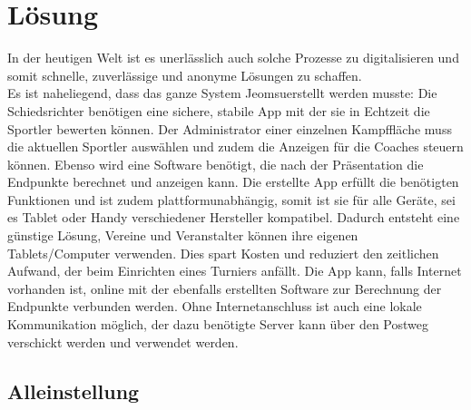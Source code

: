 \section{Lösung}

In der heutigen Welt ist es unerlässlich auch solche Prozesse zu digitalisieren und somit schnelle,
    zuverlässige und anonyme Lösungen zu schaffen.
\\
Es ist naheliegend, dass das ganze System \grqq Jeomsu\grqq erstellt werden musste:
Die Schiedsrichter benötigen eine sichere, stabile App mit der sie in Echtzeit die Sportler bewerten können.
Der Administrator einer einzelnen Kampffläche muss die aktuellen Sportler auswählen und zudem die Anzeigen für die Coaches steuern können.
Ebenso wird eine Software benötigt, die nach der Präsentation die Endpunkte berechnet und anzeigen kann. 
Die erstellte App erfüllt die benötigten Funktionen und ist zudem plattformunabhängig, somit ist sie für alle Geräte,
    sei es Tablet oder Handy verschiedener Hersteller kompatibel.
Dadurch entsteht eine günstige Lösung, Vereine und Veranstalter können ihre eigenen Tablets/Computer verwenden.
Dies spart Kosten und reduziert den zeitlichen Aufwand, der beim Einrichten eines Turniers anfällt.
Die App kann, falls Internet vorhanden ist, online mit der ebenfalls erstellten Software zur Berechnung der Endpunkte verbunden werden.
Ohne Internetanschluss ist auch eine lokale Kommunikation möglich, der dazu benötigte Server kann über den
    Postweg verschickt werden und verwendet werden.

\subsection{Alleinstellung}


